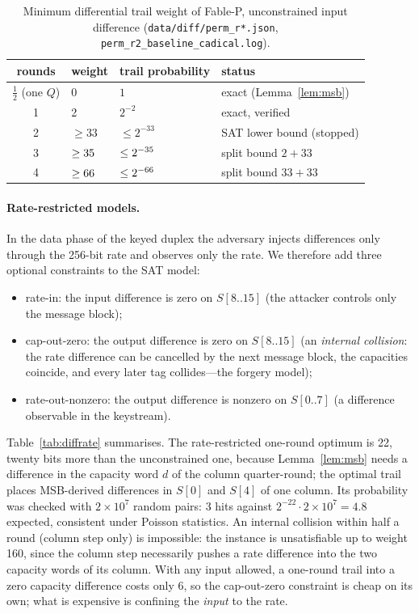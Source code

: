 \documentclass{iacrtrans}
\newcommand{\FableP}{\textsf{Fable-P}\xspace}
\newcommand{\WuncTwo}{33}    %
\begin{document}
\begin{table}[htb]
\centering
\caption{Minimum differential trail weight of \FableP, unconstrained input difference (\texttt{data/diff/perm\_r*.json}, \texttt{perm\_r2\_baseline\_cadical.log}).}
\label{tab:diffunc}
\begin{tabular}{clll}
\toprule
rounds & weight & trail probability & status\\
\midrule
$\tfrac12$ (one $Q$) & 0 & $1$ & exact (Lemma~\ref{lem:msb})\\
1 & 2 & $2^{-2}$ & exact, verified\\
2 & $\geq \WuncTwo$ & $\leq 2^{-\WuncTwo}$ & SAT lower bound (stopped)\\
3 & $\geq \the\numexpr 2+\WuncTwo\relax$ & $\leq 2^{-\the\numexpr 2+\WuncTwo\relax}$ & split bound $2+\WuncTwo$\\
4 & $\geq \the\numexpr 2*\WuncTwo\relax$ & $\leq 2^{-\the\numexpr 2*\WuncTwo\relax}$ & split bound $\WuncTwo+\WuncTwo$\\
\bottomrule
\end{tabular}
\end{table}

\paragraph{Rate-restricted models.} In the data phase of the keyed duplex the adversary injects differences only through the 256-bit rate and observes only the rate. We therefore add three optional constraints to the SAT model:
\begin{itemize}
\item \textsf{rate-in}: the input difference is zero on $S[8..15]$ (the attacker controls only the message block);
\item \textsf{cap-out-zero}: the output difference is zero on $S[8..15]$ (an \emph{internal collision}: the rate difference can be cancelled by the next message block, the capacities coincide, and every later tag collides---the forgery model);
\item \textsf{rate-out-nonzero}: the output difference is nonzero on $S[0..7]$ (a difference observable in the keystream).
\end{itemize}
Table~\ref{tab:diffrate} summarises. The rate-restricted one-round optimum is 22, twenty bits more than the unconstrained one, because Lemma~\ref{lem:msb} needs a difference in the capacity word $d$ of the column quarter-round; the optimal trail places MSB-derived differences in $S[0]$ and $S[4]$ of one column. Its probability was checked with $2\times10^7$ random pairs: 3 hits against $2^{-22}\cdot 2\times10^7 = 4.8$ expected, consistent under Poisson statistics. An internal collision within half a round (column step only) is impossible: the instance is unsatisfiable up to weight 160, since the column step necessarily pushes a rate difference into the two capacity words of its column. With any input allowed, a one-round trail into a zero capacity difference costs only 6, so the \textsf{cap-out-zero} constraint is cheap on its own; what is expensive is confining the \emph{input} to the rate.
\end{document}
